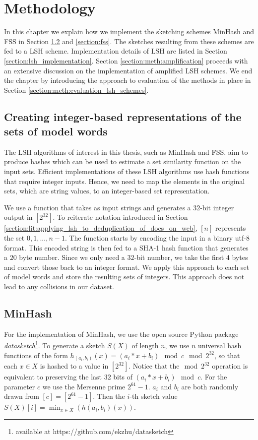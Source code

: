 \chapter{Methodology}
\label{chap:methodology}
In this chapter we explain how we implement the sketching schemes MinHash and FSS in Section \ref{section:minhash} and \ref{section:fss}. The sketches resulting from these schemes are fed to a LSH scheme. Implementation details of LSH are listed in Section \ref{section:lsh_implementation}. Section \ref{section:meth:amplification} proceeds with an extensive discussion on the implementation of amplified LSH schemes. We end the chapter by introducing the approach to evaluation of the methods in place in Section \ref{section:meth:evaluation_lsh_schemes}.

\section{Creating integer-based representations of the sets of model words}
\label{section:hashing}
The LSH algorithms of interest in this thesis, such as MinHash and FSS, aim to produce hashes which can be used to estimate a set similarity function on the input sets. Efficient implementations of these LSH algorithms use hash functions that require integer inputs. Hence, we need to map the elements in the original sets, which are string values, to an integer-based set representation. 

We use a function that takes as input strings and generates a $32$-bit integer output in $[2^{32}]$. To reiterate notation introduced in Section \ref{section:lit:applying_lsh_to_deduplication_of_docs_on_web}, $[n]$ represents the set ${0,1,...,n-1}$. The function starts by encoding the input in a binary utf-8 format. This encoded string is then fed to a SHA-1 hash function that generates a $20$ byte number. Since we only need a $32$-bit number, we take the first $4$ bytes and convert those back to an integer format. We apply this approach to each set of model words and store the resulting sets of integers. This approach does not lead to any collisions in our dataset.

\section{MinHash}
\label{section:minhash}
For the implementation of MinHash, we use the open source Python package \textit{datasketch}\footnote{available at https://github.com/ekzhu/datasketch}. To generate a sketch $S(X)$ of length $n$, we use $n$ universal hash functions of the form $h_{(a_i,b_i)}(x) = (a_i * x + b_i) \mod c \mod 2^{32}$, so that each $x \in X$ is hashed to a value in $[2^{32}]$. Notice that the$\mod 2^{32}$ operation is equivalent to preserving the last $32$ bits of $(a_i * x + b_i) \mod c$. For the parameter $c$ we use the Mersenne prime $2^{61} - 1$. $a_i$ and $b_i$ are both randomly drawn from $[c] = [2^{61} - 1]$. Then the $i$-th sketch value $S(X)[i] = \min_{x \in X}(h(a_i,b_i)(x))$.

